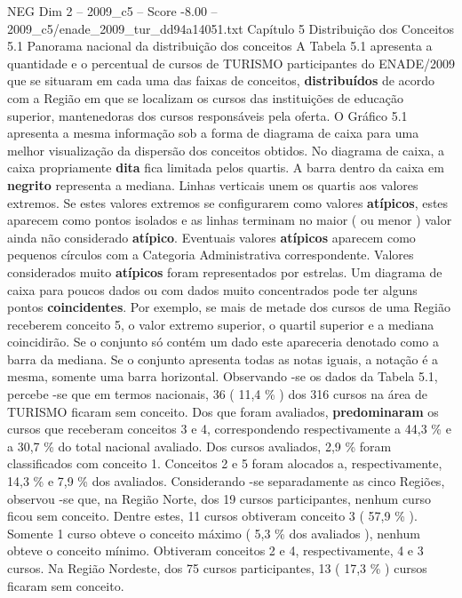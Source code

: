 \begin{textsample}{NEG Dim 2 – 2009\_c5 – Score -8.00 – 2009\_c5/enade\_2009\_tur\_dd94a14051.txt}  \label{ex:f2_neg_005}
Capítulo 5 Distribuição dos Conceitos 5.1 Panorama nacional da distribuição dos conceitos A Tabela 5.1 apresenta a quantidade e o percentual de cursos de TURISMO participantes do ENADE/2009 que se situaram em cada uma das faixas de conceitos, \textbf{distribuídos} de acordo com a Região em que se localizam os cursos das instituições de educação superior, mantenedoras dos cursos responsáveis pela oferta.
O Gráfico 5.1 apresenta a mesma informação sob a forma de diagrama de caixa para uma melhor visualização da dispersão dos conceitos obtidos.
No diagrama de caixa, a caixa propriamente \textbf{dita} fica limitada pelos quartis.
A barra dentro da caixa em \textbf{negrito} representa a mediana.
Linhas verticais unem os quartis aos valores extremos.
Se estes valores extremos se configurarem como valores \textbf{atípicos}, estes aparecem como pontos isolados e as linhas terminam no maior ( ou menor ) valor ainda não considerado \textbf{atípico}.
Eventuais valores \textbf{atípicos} aparecem como pequenos círculos com a Categoria Administrativa correspondente.
Valores considerados muito \textbf{atípicos} foram representados por estrelas.
Um diagrama de caixa para poucos dados ou com dados muito concentrados pode ter alguns pontos \textbf{coincidentes}.
Por exemplo, se mais de metade dos cursos de uma Região receberem conceito 5, o valor extremo superior, o quartil superior e a mediana coincidirão.
Se o conjunto só contém um dado este apareceria denotado como a barra da mediana.
Se o conjunto apresenta todas as notas iguais, a notação é a mesma, somente uma barra horizontal.
Observando -se os dados da Tabela 5.1, percebe -se que em termos nacionais, 36 ( 11,4 \% ) dos 316 cursos na área de TURISMO ficaram sem conceito.
Dos que foram avaliados, \textbf{predominaram} os cursos que receberam conceitos 3 e 4, correspondendo respectivamente a 44,3 \% e a 30,7 \% do total nacional avaliado.
Dos cursos avaliados, 2,9 \% foram classificados com conceito 1.
Conceitos 2 e 5 foram alocados a, respectivamente, 14,3 \% e 7,9 \% dos avaliados.
Considerando -se separadamente as cinco Regiões, observou -se que, na Região Norte, dos 19 cursos participantes, nenhum curso ficou sem conceito.
Dentre estes, 11 cursos obtiveram conceito 3 ( 57,9 \% ).
Somente 1 curso obteve o conceito máximo ( 5,3 \% dos avaliados ), nenhum obteve o conceito mínimo.
Obtiveram conceitos 2 e 4, respectivamente, 4 e 3 cursos.
Na Região Nordeste, dos 75 cursos participantes, 13 ( 17,3 \% ) cursos ficaram sem conceito.

\end{textsample}
